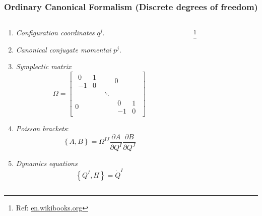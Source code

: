 \documentclass[8pt,handout]{beamer}
\begin{document}
	\begin{frame}	%
		\frametitle{Ordinary Canonical Formalism (Discrete degrees of freedom)}
  			\begin{columns}[T]
    			\begin{column}{.5\textwidth}
						\begin{enumerate}
							\item\emph{Configuration coordinates} $q^j$.
							\item\emph{Canonical conjugate momentai}  $p^j$.
							\item \emph{Symplectic matrix} 
								\begin{displaymath}
									\Omega=\begin{bmatrix}
										\begin{matrix}0 & 1\\ -1 & 0\end{matrix} & & 0 \\
											 & \ddots & \\
											 0 & & \begin{matrix}0 & 1 \\ -1 & 0
										\end{matrix}
									\end{bmatrix}
								\end{displaymath}
							\item \emph{Poisson brackets}: 
								\begin{displaymath}
									\left\{A , B \right\} = \Omega^{I J} \frac{\partial A}{\partial Q^I} \frac{\partial B}{\partial Q^J}					
								\end{displaymath}
							\item \emph{Dynamics equations}
								\begin{displaymath}
									\left\{Q^I, H \right\} = \dot{Q}^I
								\end{displaymath}
							
								
								
						\end{enumerate}
    			\end{column}
    		   	\begin{column}{.5\textwidth}
					\parbox[c][.7\textheight][c]{\columnwidth}{%
 						\center \footnote{Ref: 
 							\href{https://en.wikibooks.org/wiki/A-level_Physics_(Advancing_Physics)/Simple_Harmonic_Motion}{en.wikibooks.org}}
  					}	
    			\end{column}
  			\end{columns}	
		\end{frame}
\end{document}
